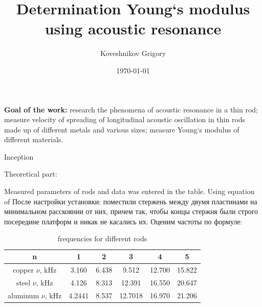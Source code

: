 \documentclass[a4paper,12pt]{article}
\author{Koveshnikov Grigory}
\title{Determination Young`s modulus using acoustic resonance}
\date{\today}
\begin{document}
\maketitle
\textbf{Goal of the work:} research the phenomena of acoustic resonance in a thin rod; measure velocity of spreading of longitudinal acoustic oscillation in thin rods made up of different metals and various sizes; measure Young`s modulus of different materials.
\begin{center}
\Large{Inception}
\end{center}
Theoretical part: 


Measured parameters of rods and data was entered in the table. Using equation of 
После настройки установки: поместили стержень между двумя пластинами на минимальном расскоянии от них, причем так, чтобы концы стержня были строго посередине платформ и никак не касались их. Оценим частоты по формуле:





 

\begin{table}
\caption{frequencies for different rods}
\begin{center}
\begin{tabular}{|c|c|c|c|c|c|}
\hline 
n & 1 & 2 & 3 & 4 & 5 \\ 
\hline 
copper \( \nu \), kHz & 3.160 & 6.438 & 9.512 & 12.700 & 15.822 \\ 
\hline 
steel \( \nu \), kHz & 4.126 & 8.313 & 12.391 & 16.550 & 20.647 \\ 
\hline 
aluminum \( \nu  \), kHz & 4.2441 & 8.537 & 12.7018 & 16.970 & 21.206 \\ 
\hline 
\end{tabular}
\end{center}
\end{table}
\end{document}

